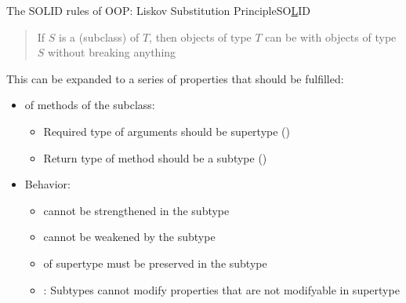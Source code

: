 \begin{frame}{The SOLID rules of OOP: Liskov Substitution Principle}{SO\underline  LID}
	\begin{quote}
		If $S$ is a  (subclass) of $T$, then objects of type $T$ can be  with objects of type $S$ without breaking anything
	\end{quote}
	This can be expanded to a series of properties that should be fulfilled:
	\begin{itemize}
		\item {} of methods of the subclass:
		\begin{itemize}
			\item 
			Required type of arguments should be supertype ()\\
			\item 
			Return type of method should be a subtype ()\\
		\end{itemize}
	\item Behavior:
		\begin{itemize}
		\item
		  cannot be strengthened in the subtype\\
		\item 
		 cannot be weakened by the subtype
		\item 
		  of supertype must be preserved in the subtype
		\item 
		: Subtypes cannot modify properties that are not modifyable in supertype\\
		\end{itemize}
	\end{itemize}
\end{frame}

